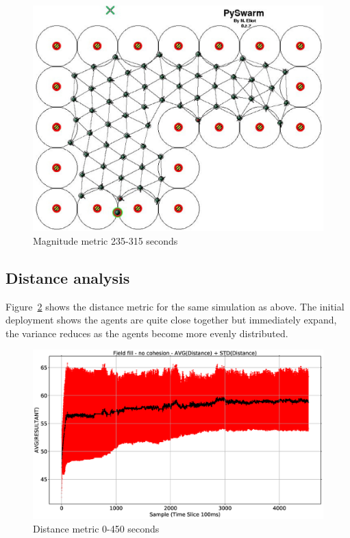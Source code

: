 \begin{figure}[H]
\begin{center}
\includegraphics[width=12cm]{CHAPTER-8/figures/REPELFILL5055-MAG-8}
\end{center}
\caption{Magnitude metric 235-315 seconds\label{emerge:REPELFILL5055-MAG-8}}
\end{figure}

\subsection{Distance analysis}
Figure~\ref{emerge:REPELFILL5055-DIST} shows the distance metric for the same simulation as above. The initial deployment shows the agents are quite close together but immediately expand, the variance reduces as the agents become more evenly distributed. 

\begin{figure}[H]
\begin{center}
\includegraphics[width=12cm]{CHAPTER-8/figures/REPELFILL5055-DIST}
\end{center}
\caption{Distance metric 0-450 seconds\label{emerge:REPELFILL5055-DIST}}
\end{figure}

